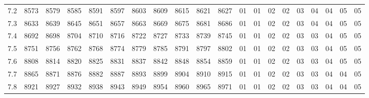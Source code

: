 \documentclass[12pt,UTF8]{ctexbook}
\begin{document}
\begin{appendix}
\begin{longtable}{|c| c c c c c | c c c c c| c c c c c c c c c|}
\scriptsize 7.2 & \scriptsize 8573 & \scriptsize 8579 & \scriptsize 8585 & \scriptsize 8591 & \scriptsize 8597 & \scriptsize 8603 & \scriptsize 8609 & \scriptsize 8615 & \scriptsize 8621 & \scriptsize 8627 & \scriptsize 01 & \scriptsize 01 & \scriptsize 02 & \scriptsize 02 & \scriptsize 03 & \scriptsize 04 & \scriptsize 04 & \scriptsize 05 & \scriptsize 05 \\
\scriptsize 7.3 & \scriptsize 8633 & \scriptsize 8639 & \scriptsize 8645 & \scriptsize 8651 & \scriptsize 8657 & \scriptsize 8663 & \scriptsize 8669 & \scriptsize 8675 & \scriptsize 8681 & \scriptsize 8686 & \scriptsize 01 & \scriptsize 01 & \scriptsize 02 & \scriptsize 02 & \scriptsize 03 & \scriptsize 04 & \scriptsize 04 & \scriptsize 05 & \scriptsize 05 \\
\scriptsize 7.4 & \scriptsize 8692 & \scriptsize 8698 & \scriptsize 8704 & \scriptsize 8710 & \scriptsize 8716 & \scriptsize 8722 & \scriptsize 8727 & \scriptsize 8733 & \scriptsize 8739 & \scriptsize 8745 & \scriptsize 01 & \scriptsize 01 & \scriptsize 02 & \scriptsize 02 & \scriptsize 03 & \scriptsize 03 & \scriptsize 04 & \scriptsize 05 & \scriptsize 05 \\
\scriptsize 7.5 & \scriptsize 8751 & \scriptsize 8756 & \scriptsize 8762 & \scriptsize 8768 & \scriptsize 8774 & \scriptsize 8779 & \scriptsize 8785 & \scriptsize 8791 & \scriptsize 8797 & \scriptsize 8802 & \scriptsize 01 & \scriptsize 01 & \scriptsize 02 & \scriptsize 02 & \scriptsize 03 & \scriptsize 03 & \scriptsize 04 & \scriptsize 05 & \scriptsize 05 \\
\scriptsize 7.6 & \scriptsize 8808 & \scriptsize 8814 & \scriptsize 8820 & \scriptsize 8825 & \scriptsize 8831 & \scriptsize 8837 & \scriptsize 8842 & \scriptsize 8848 & \scriptsize 8854 & \scriptsize 8859 & \scriptsize 01 & \scriptsize 01 & \scriptsize 02 & \scriptsize 02 & \scriptsize 03 & \scriptsize 03 & \scriptsize 04 & \scriptsize 05 & \scriptsize 05 \\
\scriptsize 7.7 & \scriptsize 8865 & \scriptsize 8871 & \scriptsize 8876 & \scriptsize 8882 & \scriptsize 8887 & \scriptsize 8893 & \scriptsize 8899 & \scriptsize 8904 & \scriptsize 8910 & \scriptsize 8915 & \scriptsize 01 & \scriptsize 01 & \scriptsize 02 & \scriptsize 02 & \scriptsize 03 & \scriptsize 03 & \scriptsize 04 & \scriptsize 04 & \scriptsize 05 \\
\scriptsize 7.8 & \scriptsize 8921 & \scriptsize 8927 & \scriptsize 8932 & \scriptsize 8938 & \scriptsize 8943 & \scriptsize 8949 & \scriptsize 8954 & \scriptsize 8960 & \scriptsize 8965 & \scriptsize 8971 & \scriptsize 01 & \scriptsize 01 & \scriptsize 02 & \scriptsize 02 & \scriptsize 03 & \scriptsize 03 & \scriptsize 04 & \scriptsize 04 & \scriptsize 05 \\

\end{longtable}
\end{appendix}
\end{document}
